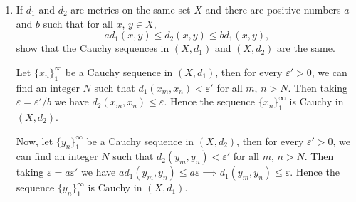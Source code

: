 \documentclass[12pt]{article}
\begin{document}
\begin{enumerate}
\begin{mybox}
    (a) $\implies$ (b).
    Let $x\in \overline{E}=X\char`\\(X\char`\\E)^\circ$.
    Then $x\notin (X\char`\\E)^\circ$. Negating this
    statement, we see that for all $r>0$,
    $B(x,r)\cap E\neq \emptyset$.
    
    \vspace*{3mm}
    (b) $\implies$ (c).
    We first define the radii $r_n=1/n$ of the open balls
    around the point $x\in X$. Since
    $B(x,r) \cap E \neq \emptyset$, $\forall r > 0$,
    we can take a sequences of points 
    $\{x_i\}_1^\infty$ in $E$ such that
    $x_i\in B(x,r_i)$ for each $i$.
    Then this is the sequence in $E$
    which converges to the point $x$.

    \vspace*{3mm}
    (c) $\implies$ (a). Since $x_n\to x$, for
    every $\varepsilon>0$
    we can find a $N$ such that $d(x,x_n)<\varepsilon$
    all $n>N$. That is, every open ball around
    $x$ contains a point of $E$. So $x\notin 
    (X\char`\\E)^\circ\implies x\in
    X\char`\\(X\char`\\E)^\circ$. Thus $x$ is in the
    closure $\overline{E}$.

\end{mybox}

 
\item If $d_1$ and $d_2$ are metrics on the same set
    $X$ and there are positive
    numbers $a$ and $b$ such that for all $x$, $y\in X$,
    $$ad_1(x, y)\leq d_2(x,y)\leq bd_1(x,y),$$
    show that the Cauchy sequences in $(X,d_1)$
    and $(X,d_2)$ are the same.
\begin{mybox}

    Let $\{x_n\}_1^\infty$ be a Cauchy sequence
    in $(X,d_1)$, then for every $\varepsilon'>0$,
    we can find an integer $N$ such that
    $d_1(x_m,x_n)<\varepsilon'$ for all $m$, $n>N$.
    Then taking $\varepsilon=\varepsilon'/b$ we
    have $d_2(x_m,x_n)\leq\varepsilon$. Hence
    the sequence $\{x_n\}_1^\infty$ is Cauchy in
    $(X,d_2)$.

    \vspace*{3mm}
    Now, let $\{y_n\}_1^\infty$ be a Cauchy sequence
    in $(X,d_2)$, then for every $\varepsilon'>0$,
    we can find an integer $N$ such that
    $d_2(y_m,y_n)<\varepsilon'$ for all $m$, $n>N$.
    Then taking $\varepsilon=a\varepsilon'$ we
    have $ad_1(y_m,y_n)\leq a\varepsilon
    \implies d_1(y_m,y_n)\leq \varepsilon$. Hence
    the sequence $\{y_n\}_1^\infty$ is Cauchy in
    $(X,d_1)$.
\end{mybox}
 

\end{enumerate}
\end{document}
